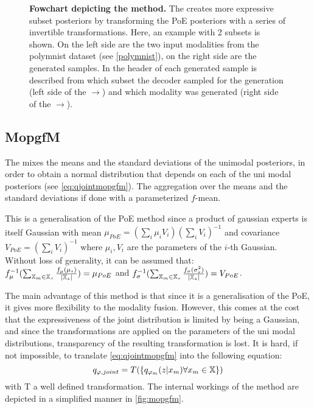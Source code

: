 \begin{figure}[h!]
    \centering
    \caption{\textbf{Fowchart depicting the  method.} The  creates more expressive subset posteriors by transforming the PoE posteriors with a series of invertible transformations.
    Here, an example with 2 subsets is shown. On the left side are the two input modalities from the polymnist dataset (see \cref{polymnist}), on the right side are the generated samples.
    In the header of each generated sample is described from which subset the decoder sampled for the generation (left side of the $\rightarrow$) and which modality was generated (right side of the $\rightarrow$).}
    \label{fig:mofopoe}
\end{figure}

\subsection{MopgfM}\label{subsec:mopgfm}
The  mixes the means and the standard deviations of the unimodal posteriors, in order to obtain a normal distribution that depends on each of the uni modal posteriors (see \cref{eq:qjointmopgfm}).
The aggregation over the means and the standard deviations if done with a parameterized $f$-mean.

\smallskip

This is a generalisation of the PoE method since a product of gaussian experts is itself Gaussian with mean $\mu_{PoE} = (\sum _i \mu _i V_i)(\sum _i V_i)^{-1}$ and covariance $V_{PoE}= (\sum _i V_i)^{-1}$ where $\mu _i, V_i$ are the parameters of the $i$-th Gaussian.\\
Without loss of generality, it can be assumed that:\\
$f_{\mu}^{-1}(\sum _{\mathbb{X}_m \in \mathbb{X}_s} \frac{f_{\mu}(\mu_s)}{|\mathbb{X}_s|}) = \mu_{PoE}$ and $f_{\sigma}^{-1}(\sum  _{\mathbb{X}_m \in \mathbb{X}_s} \frac{f_{\sigma}(\sigma_s^2)}{|\mathbb{X}_s|}) = V_{PoE}$.

\smallskip

The main advantage of this method is that since it is a generalisation of the PoE, it gives more flexibility to the modality fusion.
However, this comes at the cost that the expressiveness of the joint distribution is limited by being a Gaussian, and since the transformations are applied on the parameters of the uni modal distributions, transparency of the resulting transformation is lost.
It is hard, if not impossible, to translate \cref{eq:qjointmopgfm} into the following equation:
\begin{equation}
    q_{\varphi, joint} = T(\{q_{\varphi _m}(z|x_m) \forall x_m \in \mathbb{X}\})
\end{equation}
with T a well defined transformation.
The internal workings of the  method are depicted in a simplified manner in \cref{fig:mopgfm}.



